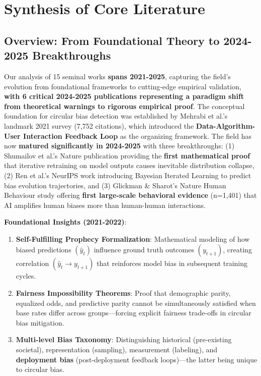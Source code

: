 \documentclass[11pt,a4paper]{article}
\begin{document}
\section{Synthesis of Core Literature}

\subsection{Overview: From Foundational Theory to 2024-2025 Breakthroughs}

Our analysis of 15 seminal works \textbf{spans 2021-2025}, capturing the field's evolution from foundational frameworks to cutting-edge empirical validation, \textbf{with 6 critical 2024-2025 publications representing a paradigm shift from theoretical warnings to rigorous empirical proof}. The conceptual foundation for circular bias detection was established by Mehrabi et al.'s \cite{mehrabi2021} landmark 2021 survey (7,752 citations), which introduced the \textbf{Data-Algorithm-User Interaction Feedback Loop} as the organizing framework. The field has now \textbf{matured significantly in 2024-2025} with three breakthroughs: (1) Shumailov et al.'s Nature publication \cite{shumailov2024} providing the \textbf{first mathematical proof} that iterative retraining on model outputs causes inevitable distribution collapse, (2) Ren et al.'s NeurIPS work \cite{ren2024} introducing Bayesian Iterated Learning to predict bias evolution trajectories, and (3) Glickman \& Sharot's Nature Human Behaviour study \cite{glickman2024} offering \textbf{first large-scale behavioral evidence} (n=1,401) that AI amplifies human biases more than human-human interactions.

\textbf{Foundational Insights (2021-2022)}:

\begin{enumerate}
    \item \textbf{Self-Fulfilling Prophecy Formalization}: Mathematical modeling of how biased predictions $(\hat{y}_t)$ influence ground truth outcomes $(y_{t+1})$, creating correlation $(\hat{y}_t \rightarrow y_{t+1})$ that reinforces model bias in subsequent training cycles.
    
    \item \textbf{Fairness Impossibility Theorems}: Proof that demographic parity, equalized odds, and predictive parity cannot be simultaneously satisfied when base rates differ across groups—forcing explicit fairness trade-offs in circular bias mitigation.
    
    \item \textbf{Multi-level Bias Taxonomy}: Distinguishing historical (pre-existing societal), representation (sampling), measurement (labeling), and \textbf{deployment bias} (post-deployment feedback loops)—the latter being unique to circular bias.
\end{enumerate}
\end{document}
